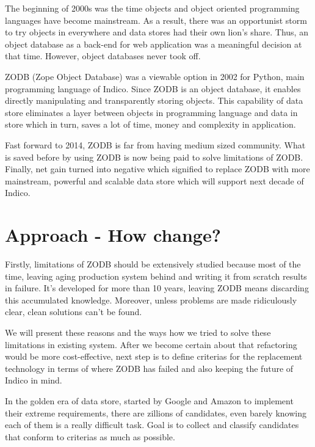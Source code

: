 \par The beginning of 2000s was the time objects and object oriented programming languages have become mainstream. As a result, there was an opportunist storm to try objects in everywhere and data stores had their own lion's share. Thus, an object database as a back-end for web application was a meaningful decision at that time. However, object databases never took off.

\par ZODB (Zope Object Database) was a viewable option in 2002 for Python, main programming language of Indico. Since ZODB is an object database, it enables directly manipulating and transparently storing objects. This capability of data store eliminates a layer between objects in programming language and data in store which in turn, saves a lot of time, money and complexity in application.

\par Fast forward to 2014, ZODB is far from having medium sized community. What is saved before by using ZODB is now being paid to solve limitations of ZODB. Finally, net gain turned into negative which signified to replace ZODB with more mainstream, powerful and scalable data store which will support next decade of Indico.

\section{Approach - How change?}

\par Firstly, limitations of ZODB should be extensively studied because most of the time, leaving aging production system behind and writing it from scratch results in failure. It's developed for more than 10 years, leaving ZODB means discarding this accumulated knowledge. Moreover, unless problems are made ridiculously clear, clean solutions can't be found.

\par We will present these reasons and the ways how we tried to solve these limitations in existing system. After we become certain about that refactoring would be more cost-effective, next step is to define criterias for the replacement technology in terms of where ZODB has failed and also keeping the future of Indico in mind. 

\par In the golden era of data store, started by Google and Amazon to implement their extreme requirements, there are zillions of candidates, even barely knowing each of them is a really difficult task. Goal is to collect and classify candidates that conform to criterias as much as possible.


